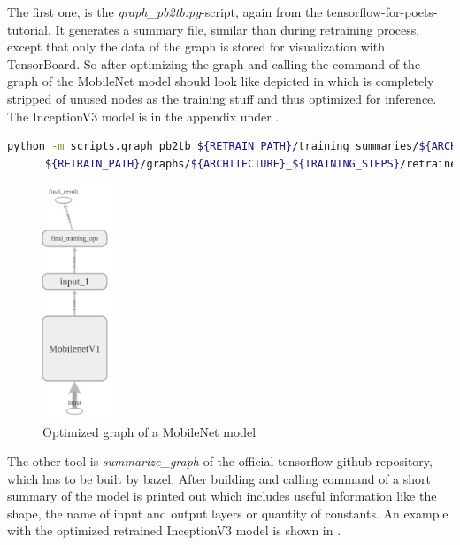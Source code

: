 The first one, is the \textit{graph_pb2tb.py}-script, again from the tensorflow-for-poets-tutorial. It generates a summary file, similar than during retraining process, except that only the data of the graph is stored for visualization with TensorBoard. So after optimizing the graph and calling the command of  the graph of the MobileNet model should look like depicted in  which is completely stripped of unused nodes as the training stuff and thus optimized for inference. The InceptionV3 model is in the appendix under . \\

\begin{minipage}{\linewidth}
\begin{lstlisting}[caption=Call of \textit{graph_pb2tb.py}, label=list:graph_pb2tb, language=bash]
	python -m scripts.graph_pb2tb ${RETRAIN_PATH}/training_summaries/${ARCHITECTURE}_${TRAINING_STEPS}/${ARCHITECTURE}_${TRAINING_STEPS}_${LEARNING_RATE}/retrained \
	  ${RETRAIN_PATH}/graphs/${ARCHITECTURE}_${TRAINING_STEPS}/retrained_dog_graph_${ARCHITECTURE}_${TRAINING_STEPS}_${LEARNING_RATE}.pb 
\end{lstlisting}
\end{minipage}

\begin{figure}[htbp]
\centering
\includegraphics[height=7cm]{includes/graphMobilenet050-700Opt4}
\caption[Optimized graph of a MobileNet model]{Optimized graph of a MobileNet model}
\label{fig:MobileNetGraphOpt4}
\end{figure}


The other tool is \textit{summarize_graph} of the official tensorflow github repository, which has to be built by bazel. After building and calling command of  a short summary of the model is printed out which includes useful information like the shape, the name of input and output layers or quantity of constants. An example with the optimized retrained InceptionV3 model is shown in .

